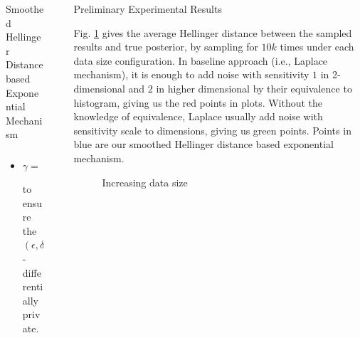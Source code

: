 \documentclass[final,hyperref={pdfpagelabels=false}]{beamer}
\begin{document}
\begin{frame}[t]
\begin{columns}[t]
\begin{column}{.485\textwidth}
\begin{block}{Smoothed Hellinger Distance based Exponential Mechanism}
\begin{itemize}
\begin{itemize}
   \item $\gamma =
   \ln(1 - \frac{\epsilon}{2 \ln (\frac{\delta}{2 (n + 1)})})$ to ensure the $(\epsilon,\delta)$-differentially private.
 \end{itemize}
\end{itemize}


\end{block}


\end{column} %

\begin{column}{.01\textwidth}\end{column} %
 
\begin{column}{.485\textwidth} %






\begin{block}{Preliminary Experimental Results}

Fig. \ref{fig_sampling} gives the average Hellinger distance between the sampled results and true posterior, by sampling for $10k$ times under each data size configuration. In baseline approach (i.e., Laplace mechanism), it is enough to add noise with sensitivity $1$ in 2-dimensional and $2$ in higher dimensional by their equivalence to histogram, giving us the red points in plots. Without the knowledge of equivalence, Laplace usually add noise with sensitivity scale to dimensions, giving us green points. Points in blue are our smoothed Hellinger distance based exponential mechanism.

\begin{figure}[H]
\begin{center}
\centering
  \caption{Increasing data size}
\label{fig_sampling}
\end{center}
\end{figure}


\end{block}
\end{column}
\end{columns}
\end{frame}
\end{document}
